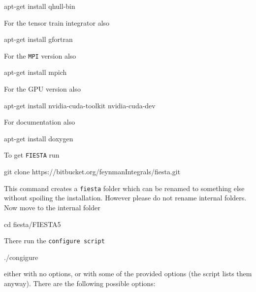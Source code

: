 \documentclass[preprint,12pt]{elsarticle}
\newenvironment{code}
  {\tt\noindent\begin{framed}\begin{flushleft}}
  {\end{flushleft}\end{framed}\normalfont}
\begin{document}
\begin{code} 
apt-get install qhull-bin
\end{code}

For the tensor train integrator also

\begin{code} 
apt-get install gfortran 
\end{code}

For the {\tt MPI} version also

\begin{code} 
apt-get install mpich
\end{code}

For the GPU version also

\begin{code} 
apt-get install nvidia-cuda-toolkit nvidia-cuda-dev
\end{code}

For documentation also

\begin{code} 
apt-get install doxygen
\end{code}

To get {\tt FIESTA} run

\begin{code} 
git clone https://bitbucket.org/feynmanIntegrals/fiesta.git
\end{code}

This command creates a {\tt fiesta} folder which can be renamed to something else without spoiling the installation. However please do not rename internal folders. Now move to the internal folder

\begin{code} 
cd fiesta/FIESTA5 
\end{code}

There run the {\tt configure script}

\begin{code} 
./congigure 
\end{code}

either with no options, or with some of the provided options (the script lists them anyway). There are the following possible options:
\end{document}
